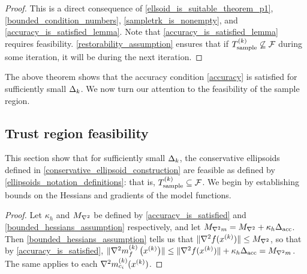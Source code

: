 \begin{proof}
This is a direct consequence of 
\cref{ellsoid_is_suitable_theorem_p1}, 
\cref{bounded_condition_numbers},
\cref{sampletrk_is_nonempty},
and \cref{accuracy_is_satisfied_lemma}.
Note that \cref{accuracy_is_satisfied_lemma} requires feasibility.
\cref{restorability_assumption} ensures that if ${T_{\text{sample}}^{(k)}} \not \subseteq {\mathcal F}$ during some iteration,
it will be during the next iteration.
\end{proof}

The above theorem shows that the accuracy condition \cref{accuracy} is satisfied for sufficiently small $\Delta_k$.   
We now turn our attention to the feasibility of the sample region.

\subsection{Trust region feasibility}
\label{ellipsoid_is_feasible_section}

This section show that for sufficiently small $\Delta_k$, the conservative ellipsoids defined in
\cref{conservative_ellipsoid_construction} are feasible as defined by \cref{ellipsoids_notation_definitions}:
that is, ${T_{\text{sample}}^{(k)}} \subseteq {\mathcal F}$.  We begin by establishing bounds on the Hessians and gradients of the model functions.

\begin{proof}

Let $\kappa_h$ and ${M_{\nabla^2}}$ be defined by \cref{accuracy_is_satisfied} and \cref{bounded_hessians_assumption} respectively,
and let ${M_{\nabla^2 m}} = {M_{\nabla^2}} + \kappa_h {\Delta_{\textrm{acc}}}$.
Then \cref{bounded_hessians_assumption} tells us that
$\|\nabla^2 f(x^{(k)})\| \le {M_{\nabla^2}}$, so that by \cref{accuracy_is_satisfied},
$\|{\nabla^2m_f^{(k)}\left(x^{(k)}\right)}\| \le \|\nabla^2 f(x^{(k)})\| + \kappa_h{\Delta_{\textrm{acc}}} = {M_{\nabla^2 m}}$.
The same applies to each $\nabla^2 m_{c_i}^{(k)}(x^{(k)})$.
\end{proof}

